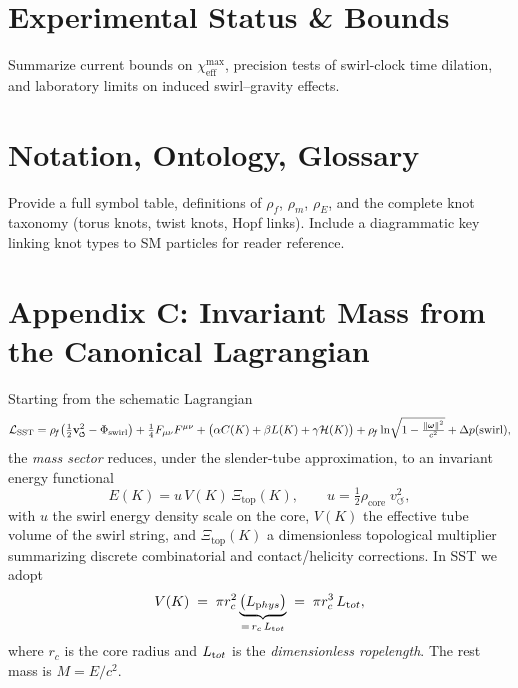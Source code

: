 \documentclass[reprint,aps,onecolumn,nofootinbib]{revtex4-2}
\newcommand{\swirlarrow}{%
    \mathchoice{\mkern-2mu\scriptstyle\boldsymbol{\circlearrowleft}}%
    {\mkern-2mu\scriptstyle\boldsymbol{\circlearrowleft}}%
    {\mkern-2mu\scriptscriptstyle\boldsymbol{\circlearrowleft}}%
    {\mkern-2mu\scriptscriptstyle\boldsymbol{\circlearrowleft}}%
}
\newcommand{\vswirl}{\mathbf{v}_{\swirlarrow}}
\newcommand{\rhof}{\rho_{\!f}}                           %
\begin{document}
    \section{Experimental Status \& Bounds}
    \label{canon58:appH}
    Summarize current bounds on $\chi_{\mathrm{eff}}^{\max}$,
    precision tests of swirl-clock time dilation,
    and laboratory limits on induced swirl–gravity effects.

    \section{Notation, Ontology, Glossary}
    \label{canon58:appI}
    Provide a full symbol table, definitions of $\rho_{\!f}$, $\rho_{\!m}$, $\rho_{\!E}$,
    and the complete knot taxonomy (torus knots, twist knots, Hopf links).
    Include a diagrammatic key linking knot types to SM particles for reader reference.




    \section*{Appendix C: Invariant Mass from the Canonical Lagrangian}

    Starting from the schematic Lagrangian
    \[
        \mathcal{L}_{\text{SST}}
        = \rhof\!\left(\tfrac{1}{2}\vswirl^2 - \Phi_{\text{swirl}}\right)
        + \tfrac{1}{4}F_{\mu\nu}F^{\mu\nu}
        + \big(\alpha C(K)+\beta L(K)+\gamma \mathcal{H}(K)\big)
        + \rhof \ln\!\sqrt{1-\tfrac{\|\boldsymbol\omega\|^2}{c^2}}
        + \Delta p(\text{swirl}),
    \]
    the \emph{mass sector} reduces, under the slender-tube approximation, to an invariant energy functional
    \[
        E(K)= u\,V(K)\,\Xi_{\text{top}}(K),\qquad
        u=\tfrac{1}{2}\rho_{\text{core}}\;v_{\circlearrowleft}^{2},
    \]
    with $u$ the swirl energy density scale on the core, $V(K)$ the effective tube volume of the swirl string, and $\Xi_{\text{top}}(K)$ a dimensionless topological multiplier summarizing discrete combinatorial and contact/helicity corrections. In SST we adopt
    \[
        V(K)\;=\;\pi r_c^2 \underbrace{\big(L_{\textrm phys}\big)}_{=\,r_c\,L_{\textrm tot}}
        \;=\;\pi r_c^3\,L_{\textrm tot},
    \]
    where $r_c$ is the core radius and $L_{\textrm tot}$ is the \emph{dimensionless ropelength}. The rest mass is $M=E/c^2$.
\end{document}
